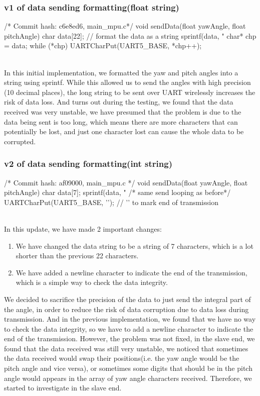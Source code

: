 \documentclass[12pt, a4paper]{article}
\begin{document}
\subsubsection{v1 of data sending formatting(float string)}\text{}
\begin{code}
/* Commit hash: c6e8ed6, main_mpu.c*/
void sendData(float yawAngle, float pitchAngle) {
    char data[22];
    // format the data as a string
    sprintf(data, "%
    char* chp = data;
    while (*chp) 
        UARTCharPut(UART5_BASE, *chp++);
}
\end{code}\text{}\\
In this initial implementation, we formatted the yaw and pitch angles into a string using sprintf. 
While this allowed us to send the angles with high precision (10 decimal places), 
the long string to be sent over UART wirelessly increases the risk of data loss. And turns out during the testing, 
we found that the data received was very unstable, we have presumed that the problem is due to the data being sent is too long, 
which means there are more characters that can potentially be lost, and just one character lost can cause the whole data to be corrupted.

\subsubsection{v2 of data sending formatting(int string)}\text{}
\begin{code}
/* Commit hash: af09000, main_mpu.c */
void sendData(float yawAngle, float pitchAngle) {
    char data[7]; 
    sprintf(data, "%
    /* same send looping as before*/
    UARTCharPut(UART5_BASE, '\n'); // '\n' to mark end of transmission
}
\end{code}
\textbf{}\\
In this update, we have made 2 important changes:
\begin{enumerate}
    \item We have changed the data string to be a string of 7 characters, which is a lot shorter than the previous 22 characters.
    \item We have added a newline character to indicate the end of the transmission, which is a simple way to check the data integrity.
\end{enumerate}
We decided to sacrifice the precision of the data to just send the integral part of the angle, 
in order to reduce the risk of data corruption due to data loss during transmission. 
And in the previous implementation, we found that we have no way to check the data integrity, 
so we have to add a newline character to indicate the end of the transmission.
However, the problem was not fixed, in the slave end, we found that the data received was still very unstable, 
we noticed that sometimes the data received would swap their positions(i.e. the yaw angle would be the pitch angle and vice versa), 
or sometimes some digits that should be in the pitch angle would appears in the array of yaw angle characters received.
Therefore, we started to investigate in the slave end.
\end{document}
